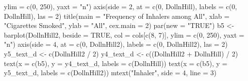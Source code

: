 \documentclass[
]{article}
\newenvironment{Shaded}{\begin{snugshade}}{\end{snugshade}}
\newcommand{\AttributeTok}[1]{\textcolor[rgb]{0.77,0.63,0.00}{#1}}
\newcommand{\ConstantTok}[1]{\textcolor[rgb]{0.00,0.00,0.00}{#1}}
\newcommand{\DecValTok}[1]{\textcolor[rgb]{0.00,0.00,0.81}{#1}}
\newcommand{\FunctionTok}[1]{\textcolor[rgb]{0.00,0.00,0.00}{#1}}
\newcommand{\NormalTok}[1]{#1}
\newcommand{\OtherTok}[1]{\textcolor[rgb]{0.56,0.35,0.01}{#1}}
\newcommand{\SpecialCharTok}[1]{\textcolor[rgb]{0.00,0.00,0.00}{#1}}
\newcommand{\StringTok}[1]{\textcolor[rgb]{0.31,0.60,0.02}{#1}}
\begin{document}
\begin{Shaded}
\begin{Highlighting}[]
                \AttributeTok{ylim =} \FunctionTok{c}\NormalTok{(}\DecValTok{0}\NormalTok{, }\DecValTok{250}\NormalTok{),}
                \AttributeTok{yaxt =} \StringTok{"n"}\NormalTok{)}
\FunctionTok{axis}\NormalTok{(}\AttributeTok{side =} \DecValTok{2}\NormalTok{, }
     \AttributeTok{at =} \FunctionTok{c}\NormalTok{(}\DecValTok{0}\NormalTok{, DollnHill),}
     \AttributeTok{labels =} \FunctionTok{c}\NormalTok{(}\DecValTok{0}\NormalTok{, DollnHill),}
     \AttributeTok{las =} \DecValTok{2}\NormalTok{)}
\FunctionTok{title}\NormalTok{(}\AttributeTok{main =} \StringTok{"Frequency of Inhalers among All"}\NormalTok{,}
      \AttributeTok{xlab =} \StringTok{"Cigarettes Smoked"}\NormalTok{, }
      \AttributeTok{ylab =} \StringTok{"All"}\NormalTok{,}
      \AttributeTok{cex.main =} \DecValTok{2}\NormalTok{)}
\FunctionTok{par}\NormalTok{(}\AttributeTok{new =} \StringTok{"TRUE"}\NormalTok{)}
\NormalTok{b5 }\OtherTok{\textless{}{-}} \FunctionTok{barplot}\NormalTok{(DollnHill2,}
              \AttributeTok{beside =} \ConstantTok{TRUE}\NormalTok{,}
              \AttributeTok{col =}\NormalTok{ cols[}\FunctionTok{c}\NormalTok{(}\DecValTok{8}\NormalTok{, }\DecValTok{7}\NormalTok{)], }
              \AttributeTok{ylim =} \FunctionTok{c}\NormalTok{(}\DecValTok{0}\NormalTok{, }\DecValTok{250}\NormalTok{),              }
              \AttributeTok{yaxt =} \StringTok{"n"}\NormalTok{)}
\FunctionTok{axis}\NormalTok{(}\AttributeTok{side =} \DecValTok{4}\NormalTok{, }
     \AttributeTok{at =} \FunctionTok{c}\NormalTok{(}\DecValTok{0}\NormalTok{, DollnHill2),}
     \AttributeTok{labels =} \FunctionTok{c}\NormalTok{(}\DecValTok{0}\NormalTok{, DollnHill2),}
     \AttributeTok{las =} \DecValTok{2}\NormalTok{)}
\NormalTok{y5\_text\_d }\OtherTok{\textless{}{-}} \FunctionTok{c}\NormalTok{(DollnHill2 }\SpecialCharTok{/} \DecValTok{2}\NormalTok{)}
\NormalTok{y4\_text\_d }\OtherTok{\textless{}{-}} \FunctionTok{c}\NormalTok{((DollnHill2 }\SpecialCharTok{+}\NormalTok{ DollnHill) }\SpecialCharTok{/} \DecValTok{2}\NormalTok{)}
\FunctionTok{text}\NormalTok{(}\AttributeTok{x =} \FunctionTok{c}\NormalTok{(b5), }
     \AttributeTok{y =}\NormalTok{ y4\_text\_d, }
     \AttributeTok{labels =} \FunctionTok{c}\NormalTok{(DollnHill))}
\FunctionTok{text}\NormalTok{(}\AttributeTok{x =} \FunctionTok{c}\NormalTok{(b5), }
     \AttributeTok{y =}\NormalTok{ y5\_text\_d, }
     \AttributeTok{labels =} \FunctionTok{c}\NormalTok{(DollnHill2))}
\FunctionTok{mtext}\NormalTok{(}\StringTok{"Inhaler"}\NormalTok{, }
      \AttributeTok{side =} \DecValTok{4}\NormalTok{, }
      \AttributeTok{line =} \DecValTok{3}\NormalTok{)}

\end{Highlighting}
\end{Shaded}
\end{document}

